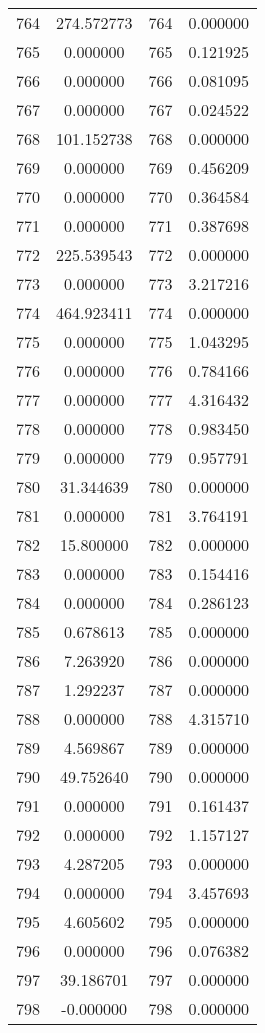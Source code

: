 \documentclass[12pt]{article}
\begin{document}
\begin{longtable}{@{}cccc@{}}
764 & 274.572773 & 764 & 0.000000 \\
765 & 0.000000 & 765 & 0.121925 \\
766 & 0.000000 & 766 & 0.081095 \\
767 & 0.000000 & 767 & 0.024522 \\
768 & 101.152738 & 768 & 0.000000 \\
769 & 0.000000 & 769 & 0.456209 \\
770 & 0.000000 & 770 & 0.364584 \\
771 & 0.000000 & 771 & 0.387698 \\
772 & 225.539543 & 772 & 0.000000 \\
773 & 0.000000 & 773 & 3.217216 \\
774 & 464.923411 & 774 & 0.000000 \\
775 & 0.000000 & 775 & 1.043295 \\
776 & 0.000000 & 776 & 0.784166 \\
777 & 0.000000 & 777 & 4.316432 \\
778 & 0.000000 & 778 & 0.983450 \\
779 & 0.000000 & 779 & 0.957791 \\
780 & 31.344639 & 780 & 0.000000 \\
781 & 0.000000 & 781 & 3.764191 \\
782 & 15.800000 & 782 & 0.000000 \\
783 & 0.000000 & 783 & 0.154416 \\
784 & 0.000000 & 784 & 0.286123 \\
785 & 0.678613 & 785 & 0.000000 \\
786 & 7.263920 & 786 & 0.000000 \\
787 & 1.292237 & 787 & 0.000000 \\
788 & 0.000000 & 788 & 4.315710 \\
789 & 4.569867 & 789 & 0.000000 \\
790 & 49.752640 & 790 & 0.000000 \\
791 & 0.000000 & 791 & 0.161437 \\
792 & 0.000000 & 792 & 1.157127 \\
793 & 4.287205 & 793 & 0.000000 \\
794 & 0.000000 & 794 & 3.457693 \\
795 & 4.605602 & 795 & 0.000000 \\
796 & 0.000000 & 796 & 0.076382 \\
797 & 39.186701 & 797 & 0.000000 \\
798 & -0.000000 & 798 & 0.000000 \\

\end{longtable}
\end{document}
